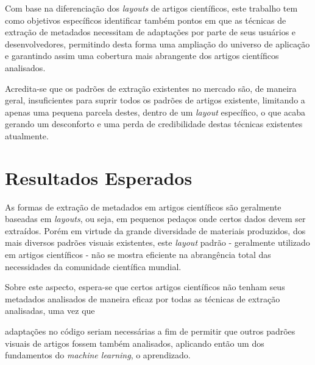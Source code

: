 \begin{textedited}

Com base na diferenciação dos \textit{layouts} de artigos científicos, este trabalho tem como objetivos específicos identificar também pontos em que as técnicas de extração de metadados necessitam de adaptações por parte de seus usuários e desenvolvedores, permitindo desta forma uma ampliação do universo de aplicação e garantindo assim uma cobertura mais abrangente dos artigos científicos analisados.

Acredita-se que os padrões de extração existentes no mercado são, de maneira geral, insuficientes para suprir todos os padrões de artigos existente, limitando a apenas uma pequena parcela destes, dentro de um \textit{layout} específico, o que acaba gerando um desconforto e uma perda de credibilidade destas técnicas existentes atualmente.

\end{textedited}

\section{Resultados Esperados}
\label{sec:expected-results}


\begin{textedited}

As formas de extração de metadados em artigos científicos são geralmente baseadas em \textit{layouts}, ou seja, em pequenos pedaços onde certos dados devem ser extraídos. Porém em virtude da grande diversidade de materiais produzidos, dos mais diversos padrões visuais existentes, este \textit{layout} padrão - geralmente utilizado em artigos científicos - não se mostra eficiente na abrangência total das necessidades da comunidade científica mundial. 

\end{textedited}

Sobre este aspecto, espera-se que certos artigos científicos não tenham seus metadados analisados de maneira eficaz por todas as técnicas de extração analisadas, uma vez que \begin{textedited}adaptações no código seriam necessárias a fim de permitir que outros padrões visuais de artigos fossem também analisados, aplicando então um dos fundamentos do \textit{machine learning}, o aprendizado. 

\end{textedited}

